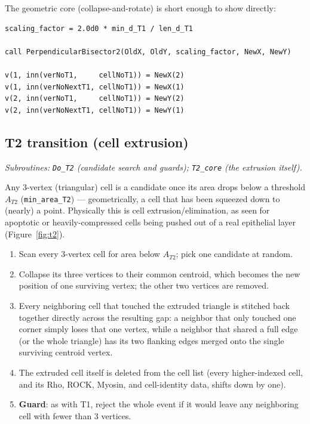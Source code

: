 \documentclass[11pt]{article}
\begin{document}
The geometric core (collapse-and-rotate) is short enough to show directly:
\begin{lstlisting}[caption={T1 core: rotating the collapsing edge by $90^\circ$ about
its own midpoint (from \texttt{T1\_swap.f90}). \texttt{scaling\_factor} re-expands the
new edge back out to (at least) the minimum length.}]
scaling_factor = 2.0d0 * min_d_T1 / len_d_T1

call PerpendicularBisector2(OldX, OldY, scaling_factor, NewX, NewY)

v(1, inn(verNoT1,     cellNoT1)) = NewX(2)
v(1, inn(verNoNextT1, cellNoT1)) = NewX(1)
v(2, inn(verNoT1,     cellNoT1)) = NewY(2)
v(2, inn(verNoNextT1, cellNoT1)) = NewY(1)
\end{lstlisting}

\subsection{T2 transition (cell extrusion)}
\textit{Subroutines: \texttt{Do\_T2} (candidate search and guards); \texttt{T2\_core}
(the extrusion itself).}

Any 3-vertex (triangular) cell is a candidate once its area drops below a threshold
$A_{T2}$ (\texttt{min\_area\_T2}) --- geometrically, a cell that has been squeezed down
to (nearly) a point. Physically this is cell extrusion/elimination, as seen for
apoptotic or heavily-compressed cells being pushed out of a real epithelial layer
(Figure~\ref{fig:t2}).
\begin{enumerate}[label=(\arabic*)]
  \item Scan every 3-vertex cell for area below $A_{T2}$; pick one candidate at random.
  \item Collapse its three vertices to their common centroid, which becomes the new
  position of one surviving vertex; the other two vertices are removed.
  \item Every neighboring cell that touched the extruded triangle is stitched back
  together directly across the resulting gap: a neighbor that only touched one corner
  simply loses that one vertex, while a neighbor that shared a full edge (or the whole
  triangle) has its two flanking edges merged onto the single surviving centroid
  vertex.
  \item The extruded cell itself is deleted from the cell list (every higher-indexed
  cell, and its Rho, ROCK, Myosin, and cell-identity data, shifts down by one).
  \item \textbf{Guard}: as with T1, reject the whole event if it would leave any
  neighboring cell with fewer than 3 vertices.
\end{enumerate}
\end{document}
